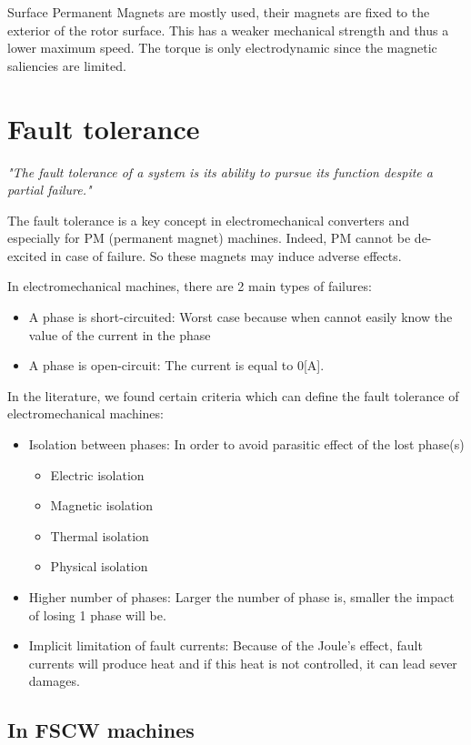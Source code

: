 Surface Permanent Magnets are mostly used, their magnets are fixed to the exterior of the rotor surface. This has a weaker mechanical strength and thus a lower maximum speed. The torque is only electrodynamic since the magnetic saliencies are limited.

\section{Fault tolerance}

\textit{"The fault tolerance of a system is its ability to pursue its function despite a partial failure."}

The fault tolerance is a key concept in electromechanical converters and especially for PM (permanent magnet) machines. Indeed, PM cannot be de-excited in case of failure. So these magnets may induce adverse effects. 

In electromechanical machines, there are 2 main types of failures:
\begin{itemize}
    \item A phase is short-circuited: Worst case because when cannot easily know the value of the current in the phase
    \item A phase is open-circuit: The current is equal to 0[A].
\end{itemize}
In the literature, we found certain criteria which can define the fault tolerance of electromechanical machines:
\begin{itemize}
    \item Isolation between phases: In order to avoid parasitic effect of the lost phase(s)
    \begin{itemize}
        \item Electric isolation
        \item Magnetic isolation
        \item Thermal isolation
        \item Physical isolation
    \end{itemize}
    \item Higher number of phases: Larger the number of phase is, smaller the impact of losing 1 phase will be.
    \item Implicit limitation of fault currents: Because of the Joule's effect, fault currents will produce heat and if this heat is not controlled, it can lead sever damages.
\end{itemize}
    
\subsection{In FSCW machines}
    
